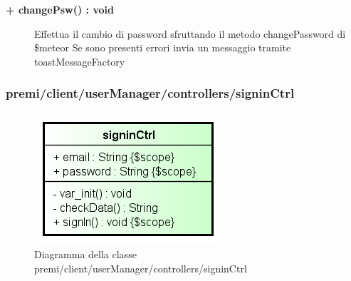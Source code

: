 \begin{description}
	\begin{description}
		\item[\textbf{\color{blue}+ changePsw() : void			}] \hfill
			Effettua il cambio di password sfruttando il metodo changePassword di \$meteor
			Se sono presenti errori invia un messaggio tramite toastMessageFactory
	\end{description}

\end{description}


\subsubsection{premi/client/userManager/controllers/signinCtrl}
\begin{figure}[H]
\begin{center}
\includegraphics[scale=0.85]{img/diacla/signinCtrl.png}
\caption{Diagramma della classe premi/client/userManager/controllers/signinCtrl}
\end{center}
\end{figure}


